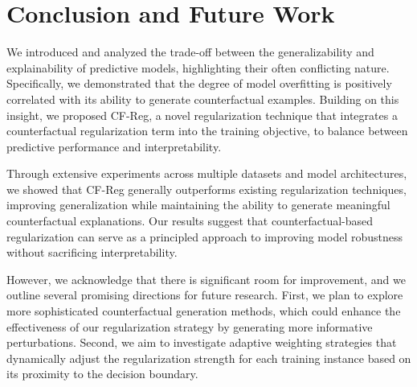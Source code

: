 \section{Conclusion and Future Work}
\label{sec:conclusion}
We introduced and analyzed the trade-off between the generalizability and explainability of predictive models, highlighting their often conflicting nature. Specifically, we demonstrated that the degree of model overfitting is positively correlated with its ability to generate counterfactual examples. 
Building on this insight, we proposed CF-Reg, a novel regularization technique that integrates a counterfactual regularization term into the training objective, to balance between predictive performance and interpretability.

Through extensive experiments across multiple datasets and model architectures, we showed that CF-Reg generally outperforms existing regularization techniques, improving generalization while maintaining the ability to generate meaningful counterfactual explanations. Our results suggest that counterfactual-based regularization can serve as a principled approach to improving model robustness without sacrificing interpretability.

However, we acknowledge that there is significant room for improvement, and we outline several promising directions for future research. First, we plan to explore more sophisticated counterfactual generation methods, which could enhance the effectiveness of our regularization strategy by generating more informative perturbations. Second, we aim to investigate adaptive weighting strategies that dynamically adjust the regularization strength for each training instance based on its proximity to the decision boundary. %

